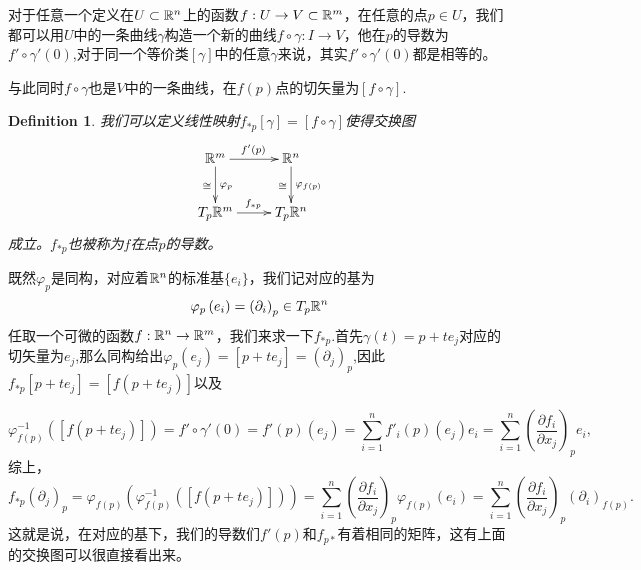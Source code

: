 \documentclass[8pt]{book}
\theoremstyle{plain}%
\newtheorem{defi}{Definition}[section]%
\begin{document}
对于任意一个定义在$U\subset \mathbb{R}^n$上的函数$f:U\rightarrow V\subset \mathbb{R}^m$，在任意的点$p\in U$，我们都可以用$U$中的一条曲线$\gamma$构造一个新的曲线$f\circ \gamma:I\to V$，他在$p$的导数为$f'\circ \gamma'(0)$,对于同一个等价类$[\gamma]$中的任意$\gamma$来说，其实$f'\circ \gamma'(0)$都是相等的。

与此同时$f\circ \gamma$也是$V$中的一条曲线，在$f(p)$点的切矢量为$\left[f\circ \gamma\right]$.
\begin{defi}
	我们可以定义线性映射$f_{*p}[\gamma]=\left[f\circ \gamma\right]$使得交换图
	\[
		\xymatrix{
		\rr^m\ar[d]_\cong^{\varphi_p}\ar[r]^{f'(p)}&\rr^n\ar[d]_\cong^{\varphi_{f(p)}}\\
		T_{p}\rr^m\ar[r]^{f_{*p}}&T_{p}\rr^n
		}
	\]
成立。$f_{*p}$也被称为$f$在点$p$的导数。
\end{defi}
既然$\varphi_p$是同构，对应着$\mathbb{R}^n$的标准基$\{e_i\}$，我们记对应的基为
\[
	\varphi_p\left(e_i\right)=\left(\partial_i\right)_p\in T_p\mathbb{R}^n
\]
任取一个可微的函数$f:\mathbb{R}^n\to\mathbb{R}^m$，我们来求一下$f_{*p}$.首先$\gamma(t)=p+te_j$对应的切矢量为$e_j$,那么同构给出$\varphi_p\left(e_j\right)=\left[p+te_j\right]=\left(\partial_j\right)_p$,因此$f_{*p}\left[p+te_j\right]=\left[f(p+te_j)\right]$以及

\[
	\varphi_{f(p)}^{-1}\left(\left[f(p+te_j)\right]\right)=f'\circ \gamma'(0)=f'(p)\left(e_j\right)=\sum_{i=1}^n f'_i(p)\left(e_j\right)e_i=\sum_{i=1}^n \left(\frac{\partial f_i}{\partial x_j}\right)_p e_i,
\]
综上，
\[
	f_{*p}\left(\partial_j\right)_p=\varphi_{f(p)}\left(\varphi_{f(p)}^{-1}\left(\left[f(p+te_j)\right]\right)\right)=\sum_{i=1}^n \left(\frac{\partial f_i}{\partial x_j}\right)_p\varphi_{f(p)}(e_i) =\sum_{i=1}^n\left(\frac{\partial f_i}{\partial x_j}\right)_p\left(\partial_i\right)_{f(p)}.
\]
这就是说，在对应的基下，我们的导数们$f'(p)$和$f_{p*}$有着相同的矩阵，这有上面的交换图可以很直接看出来。
\end{document}
